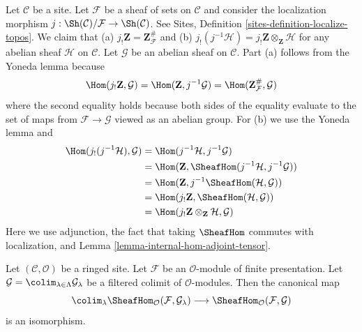 \begin{remark}
\label{remark-j-shriek-tensor}
Let $\mathcal{C}$ be a site. Let $\mathcal{F}$ be a sheaf of
sets on $\mathcal{C}$ and consider the localization morphism
$j : \Sh(\mathcal{C})/\mathcal{F} \to \Sh(\mathcal{C})$.
See Sites, Definition \ref{sites-definition-localize-topos}.
We claim that (a) $j_!\mathbf{Z} = \mathbf{Z}_\mathcal{F}^\#$
and (b) $j_!(j^{-1}\mathcal{H}) = j_!\mathbf{Z} \otimes_\mathbf{Z} \mathcal{H}$
for any abelian sheaf $\mathcal{H}$ on $\mathcal{C}$.
Let $\mathcal{G}$ be an abelian sheaf on $\mathcal{C}$.
Part (a) follows from the Yoneda lemma because
$$
\Hom(j_!\mathbf{Z}, \mathcal{G}) =
\Hom(\mathbf{Z}, j^{-1}\mathcal{G}) =
\Hom(\mathbf{Z}_\mathcal{F}^\#, \mathcal{G})
$$
where the second equality holds because both sides of
the equality evaluate to the set of maps from $\mathcal{F} \to \mathcal{G}$
viewed as an abelian group. For (b) we use the Yoneda lemma and
\begin{align*}
\Hom(j_!(j^{-1}\mathcal{H}), \mathcal{G})
& =
\Hom(j^{-1}\mathcal{H}, j^{-1}\mathcal{G}) \\
& =
\Hom(\mathbf{Z}, \SheafHom(j^{-1}\mathcal{H}, j^{-1}\mathcal{G})) \\
& =
\Hom(\mathbf{Z}, j^{-1}\SheafHom(\mathcal{H}, \mathcal{G})) \\
& =
\Hom(j_!\mathbf{Z}, \SheafHom(\mathcal{H}, \mathcal{G})) \\
& =
\Hom(j_!\mathbf{Z} \otimes_\mathbf{Z} \mathcal{H}, \mathcal{G})
\end{align*}
Here we use adjunction, the fact that taking $\SheafHom$ commutes
with localization, and Lemma \ref{lemma-internal-hom-adjoint-tensor}.
\end{remark}

\begin{lemma}
\label{lemma-hom-finite-presentation-colimit}
Let $(\mathcal{C}, \mathcal{O})$ be a ringed site.
Let $\mathcal{F}$ be an $\mathcal{O}$-module of finite presentation. Let
$\mathcal{G} = \colim_{\lambda \in \Lambda} \mathcal{G}_\lambda$
be a filtered colimit of $\mathcal{O}$-modules. Then the canonical map
$$
\colim_\lambda \SheafHom_\mathcal{O}(\mathcal{F}, \mathcal{G}_\lambda)
\longrightarrow
\SheafHom_\mathcal{O}(\mathcal{F}, \mathcal{G})
$$
is an isomorphism.
\end{lemma}

